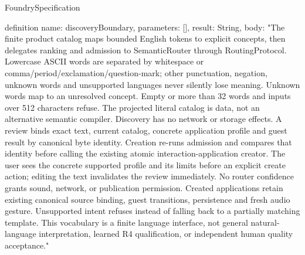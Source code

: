 \begin{lexlean}{FoundrySpecification}
\begin{semanticmodule}
definition{
  name: discoveryBoundary,
  parameters: [],
  result: String,
  body: "The finite product catalog maps bounded English tokens to explicit concepts, then delegates ranking and admission to SemanticRouter through RoutingProtocol. Lowercase ASCII words are separated by whitespace or comma/period/exclamation/question-mark; other punctuation, negation, unknown words and unsupported languages never silently lose meaning. Unknown words map to an unresolved concept. Empty or more than 32 words and inputs over 512 characters refuse. The projected literal catalog is data, not an alternative semantic compiler. Discovery has no network or storage effects. A review binds exact text, current catalog, concrete application profile and guest result by canonical byte identity. Creation re-runs admission and compares that identity before calling the existing atomic interaction-application creator. The user sees the concrete supported profile and its limits before an explicit create action; editing the text invalidates the review immediately. No router confidence grants sound, network, or publication permission. Created applications retain existing canonical source binding, guest transitions, persistence and fresh audio gesture. Unsupported intent refuses instead of falling back to a partially matching template. This vocabulary is a finite language interface, not general natural-language interpretation, learned R4 qualification, or independent human quality acceptance."
}


\end{semanticmodule}
\end{lexlean}
